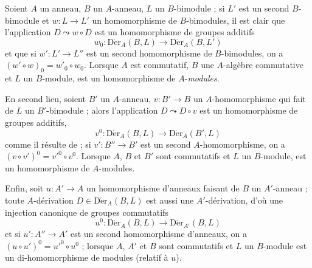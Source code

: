 \begin{env}[20.2.1]
\label{0.20.2.1-fr}
Soient $A$ un anneau, $B$ un $A$-anneau, $L$ un $B$-bimodule ; si $L'$ est
un second $B$-bimodule et $w:L\to L'$ un homomorphisme de $B$-bimodules, il
est clair que l'application $D\leadsto w\circ D$ est un homomorphisme de
groupes additifs
\begin{equation}
\tag{20.2.1.1}
\label{0.20.2.1.1-fr}
  w_0:\operatorname{D\acute{e}r}_A(B,L)\to\operatorname{D\acute{e}r}_A(B,L')
\end{equation}
et que si $w':L'\to L''$ est un second homomorphisme de $B$-bimodules, on a
$(w'\circ w)_0=w'_0\circ w_0$. Lorsque $A$ est commutatif, $B$ une
$A$-algèbre commutative et $L$ un $B$-module,  est un
homomorphisme de $A$-\emph{modules}.

En second lieu, soient $B'$ un $A$-anneau, $v:B'\to B$ un
$A$-homomorphisme qui fait de $L$ un $B'$-bimodule ; alors l'application
$D\leadsto D\circ v$ est un homomorphisme de groupes additifs,
\begin{equation}
\tag{20.2.1.2}
\label{0.20.2.1.2-fr}
  v^0:\operatorname{D\acute{e}r}_A(B,L)\to\operatorname{D\acute{e}r}_A(B',L)
\end{equation}
comme il résulte de  ; si $v':B''\to B'$ est un second
$A$-homomorphisme, on a $(v\circ v')^0=v'^0\circ v^0$. Lorsque $A$, $B$ et
$B'$ sont commutatifs et $L$ un $B$-module,  est un
homomorphisme de $A$-modules.

Enfin, soit $u:A'\to A$ un homomorphisme d'anneaux faisant de $B$ un
$A'$-anneau ; toute $A$-dérivation $D\in\operatorname{D\acute{e}r}_A(B,L)$ est aussi
une $A'$-dérivation, d'où une injection canonique de groupes commutatifs
\begin{equation}
\tag{20.2.1.3}
\label{0.20.2.1.3-fr}
  u^0:\operatorname{D\acute{e}r}_A(B,L)\to\operatorname{D\acute{e}r}_{A'}(B,L)
\end{equation}
et si $u':A''\to A'$ est un second homomorphisme d'anneaux, on a
$(u\circ u')^0=u'^0\circ u^0$ ; lorsque $A$, $A'$ et $B$ sont commutatifs et
$L$ un $B$-module  est un di-homomorphisme de modules
(relatif à $u$).


\end{env}
